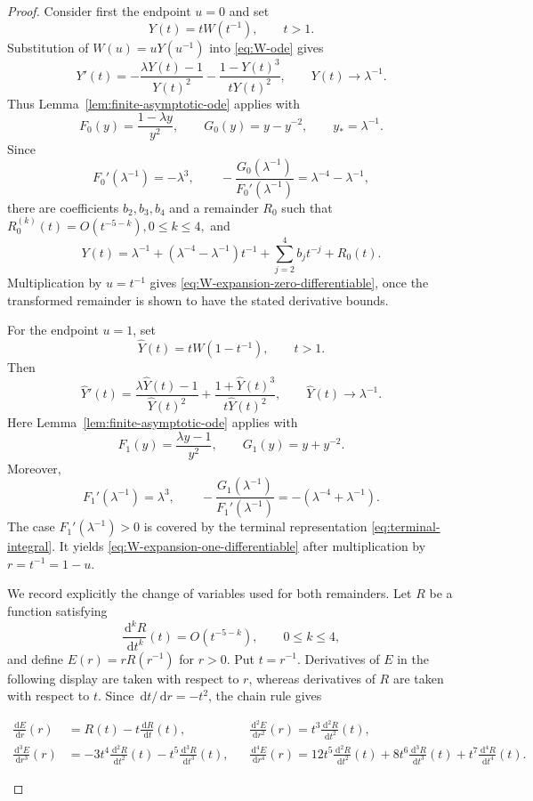 \documentclass[12pt,preprint]{amsart}
\numberwithin{equation}{section}
\theoremstyle{plain}
\theoremstyle{definition}
\newcommand{\dd}{\,\mathrm d}
\begin{document}
\begin{proof}
Consider first the endpoint $u=0$ and set
\[
 Y(t)=tW(t^{-1}),
 \qquad t>1.
\]
Substitution of $W(u)=uY(u^{-1})$ into \eqref{eq:W-ode} gives
\begin{equation*}
 Y'(t)=-\frac{\lambda Y(t)-1}{Y(t)^2}
       -\frac{1-Y(t)^3}{tY(t)^2},
 \qquad
 Y(t)\longrightarrow \lambda^{-1}.
\end{equation*}
Thus Lemma~\ref{lem:finite-asymptotic-ode} applies with
\[
 F_0(y)=\frac{1-\lambda y}{y^2},
 \qquad
 G_0(y)=y-y^{-2},
 \qquad
 y_*=\lambda^{-1}.
\]
Since
\[
 F_0'(\lambda^{-1})=-\lambda^3,
 \qquad
 -\frac{G_0(\lambda^{-1})}{F_0'(\lambda^{-1})}
 =\lambda^{-4}-\lambda^{-1},
\]
there are coefficients $b_2,b_3,b_4$ and a remainder $R_0$ such that
\(
 R_0^{(k)}(t)=O(t^{-5-k}),
 0\le k\le4,
\)
and
\[
 Y(t)=\lambda^{-1}
 +\left(\lambda^{-4}-\lambda^{-1}\right)t^{-1}
 +\sum_{j=2}^4b_jt^{-j}+R_0(t).
\]
Multiplication by $u=t^{-1}$ gives
\eqref{eq:W-expansion-zero-differentiable}, once the transformed remainder
is shown to have the stated derivative bounds.

For the endpoint $u=1$, set
\[
 \widehat Y(t)=tW(1-t^{-1}),
 \qquad t>1.
\]
Then
\begin{equation*}
 \widehat Y'(t)=\frac{\lambda\widehat Y(t)-1}{\widehat Y(t)^2}
 +\frac{1+\widehat Y(t)^3}{t\widehat Y(t)^2},
 \qquad
 \widehat Y(t)\longrightarrow\lambda^{-1}.
\end{equation*}
Here Lemma~\ref{lem:finite-asymptotic-ode} applies with
\[
 F_1(y)=\frac{\lambda y-1}{y^2},
 \qquad
 G_1(y)=y+y^{-2}.
\]
Moreover,
\[
 F_1'(\lambda^{-1})=\lambda^3,
 \qquad
 -\frac{G_1(\lambda^{-1})}{F_1'(\lambda^{-1})}
 =-(\lambda^{-4}+\lambda^{-1}).
\]
The case $F_1'(\lambda^{-1})>0$ is covered by the terminal representation
\eqref{eq:terminal-integral}.  It yields
\eqref{eq:W-expansion-one-differentiable} after multiplication by
$r=t^{-1}=1-u$.

We record explicitly the change of variables used for both remainders.  Let
$R$ be a function satisfying
\[
 \frac{\dd^kR}{\dd t^k}(t)=O(t^{-5-k}),
 \qquad 0\le k\le4,
\]
and define $E(r)=rR(r^{-1})$ for $r>0$.  Put $t=r^{-1}$.
Derivatives of $E$ in the following display are taken with respect to $r$,
whereas derivatives of $R$ are taken with respect to $t$.  Since
$\dd t/\dd r=-t^2$, the chain rule gives
\begin{samepage}
 \begin{align*}
  \frac{\dd E}{\dd r}(r)&=R(t)-t\frac{\dd R}{\dd t}(t),
 &&\frac{\dd^2E}{\dd r^2}(r)=t^3\frac{\dd^2R}{\dd t^2}(t), \\
  \frac{\dd^3E}{\dd r^3}(r)&=-3t^4\frac{\dd^2R}{\dd t^2}(t)-t^5\frac{\dd^3R}{\dd t^3}(t),
  &&\frac{\dd^4E}{\dd r^4}(r)=12t^5\frac{\dd^2R}{\dd t^2}(t)+8t^6\frac{\dd^3R}{\dd t^3}(t)+t^7\frac{\dd^4R}{\dd t^4}(t).
\end{align*}
\end{samepage}


\end{proof}
\end{document}
